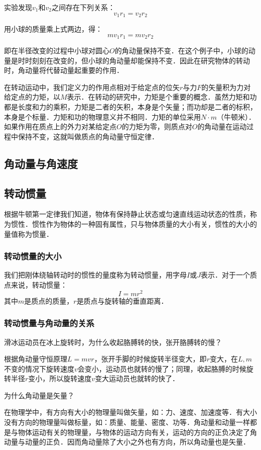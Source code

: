 实验发现$v_1$和$v_2$之间存在下列关系：
\begin{equation}
v_1r_1=v_2r_2
\end{equation}

用小球的质量乘上式两边，得：
\begin{equation}
mv_1r_1=mv_2r_2
\end{equation}

即在半径改变的过程中小球对圆心$O$的角动量保持不变．在这个例子中，小球的动量是时时刻刻在改变的，但小球的角动量却能保持不变．因此在研究物体的转动时，角动量将代替动量起重要的作用．

在转动运动中，我们定义力的作用点相对于给定点的位矢$r$与力$F$的矢量积为力对给定点的力矩，以$M$表示．在转动的研究中，力矩是个重要的概念．虽然力矩和功都是长度和力的乘积，力矩是二者的矢积，本身是个矢量；而功却是二者的标积，本身是个标量．力矩和功的物理意义并不相同．力矩的单位采用$N\cdot m$（牛顿米）．如果作用在质点上的外力对某给定点$O$的力矩为零，则质点对$O$的角动量在运动过程中保持不变，这就叫做质点的角动量守恒定律．
\subsection{角动量与角速度}

\subsection{转动惯量}
根据牛顿第一定律我们知道，物体有保持静止状态或匀速直线运动状态的性质，称为惯性．惯性作为物体的一种固有属性，只与物体质量的大小有关，惯性的大小的量值称为惯量．
\subsubsection{转动惯量的大小}
我们把刚体绕轴转动时的惯性的量度称为转动惯量，用字母$I$或$J$表示．对于一个质点来说，转动惯量：
\begin{equation}
I=mr^{2}
\end{equation}
其中$m$是质点的质量，$r$是质点与旋转轴的垂直距离．
\subsubsection{转动惯量与角动量的关系}

\begin{example}{}
滑冰运动员在冰上旋转时，为什么收起胳膊转的快，张开胳膊转的慢？

根据角动量守恒原理$L=mvr$，张开手脚的时候旋转半径变大，即$r$变大，在$L,m$不变的情况下旋转速度$v$会变小，运动员也就转的慢了；同理，收起胳膊的时候旋转半径$r$变小，所以旋转速度$v$变大运动员也就转的快了．
\end{example}
\begin{example}{}
为什么角动量是矢量？

在物理学中，有方向有大小的物理量叫做矢量，如：力、速度、加速度等．有大小没有方向的物理量叫做标量，如：质量、能量、密度、功等．角动量和动量一样都是与物体运动有关的物理量，与物体的运动方向有关，运动的方向的正负决定了角动量与动量的正负．因而角动量除了大小之外也有方向，所以角动量也是矢量．
\end{example}

